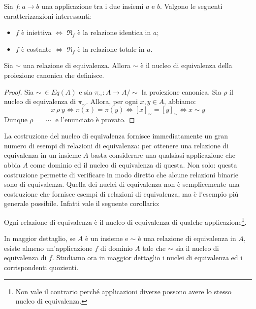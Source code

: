 \begin{osservation}
	Sia $f:a \rightarrow b$ una applicazione tra i due insiemi $a$ e $b$. Valgono le seguenti caratterizzazioni interessanti:
	\begin{itemize}
		\item $f$ è iniettiva $\iff$ $\mathfrak{R}_{f}$ è la relazione identica in $a$; 
		\item $f$ è costante $\iff$ $\mathfrak{R}_{f}$ è la relazione totale in $a$.
	\end{itemize}
\end{osservation}

\begin{propbox}
	Sia $\sim$ una relazione di equivalenza. Allora $\sim$ è il nucleo di equivalenza della proiezione canonica che definisce.
\end{propbox}

\begin{proof}
	Sia $\sim \ \in Eq(A)$ e sia $\pi_{\sim}: A \rightarrow A/{\sim}$ la proiezione canonica. Sia $\rho$ il nucleo di equivalenza di $\pi_{\sim}$. Allora, per ogni $x,y \in A$, abbiamo:
	\begin{displaymath}
		x \ \rho \ y \Leftrightarrow \pi(x)= \pi(y)  \Leftrightarrow [x]_{\sim} = [y]_{\sim} \Leftrightarrow x \sim y
	\end{displaymath}
	Dunque $\rho = \ \sim$ e l'enunciato è provato.
\end{proof}

La costruzione del nucleo di equivalenza fornisce immediatamente un gran numero di esempi di relazioni di equivalenza: per ottenere una relazione di equivalenza in un insieme $A$ basta considerare una qualsiasi applicazione che abbia $A$ come dominio ed il nucleo di equivalenza di questa. Non solo: questa costruzione permette di verificare in modo diretto che alcune relazioni binarie sono di equivalenza. Quella dei nuclei di equivalenza non è semplicemente una costruzione che fornisce esempi di relazioni di equivalenza, ma è l’esempio più generale possibile. Infatti vale il seguente corollario:

\begin{corolbox}
	Ogni relazione di equivalenza è il nucleo di equivalenza di qualche applicazione\footnote{Non vale il contrario perché applicazioni diverse possono avere lo stesso nucleo di equivalenza.}. 
\end{corolbox}

In maggior dettaglio, se $A$ è un insieme e $\sim$ è una relazione di equivalenza in $A$, esiste almeno un’applicazione $f$ di dominio $A$ tale che $\sim$ sia il nucleo di equivalenza di $f$. Studiamo ora in maggior dettaglio i nuclei di equivalenza ed i corrispondenti quozienti.

